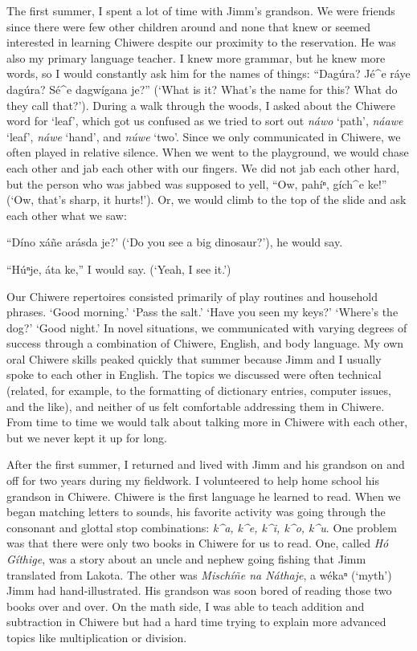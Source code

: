 \documentclass[output=paper]{LSP/langsci}
\begin{document}
The first summer, I spent a lot of time with Jimm's grandson. We were friends since there were few other children around and none that knew or seemed interested in learning Chiwere despite our proximity to the reservation. He was also my primary language teacher. I knew more grammar, but he knew more words, so I would constantly ask him for the names of things: ``Dagúra? Jé\^{ }e ráye dagúra? Sé\^{ }e dagwígana je?'' (`What is it? What's the name for this? What do they call that?'). During a walk through the woods, I asked about the Chiwere word for `leaf', which got us confused as we tried to sort out \emph{náwo} `path', \emph{náawe} `leaf', \emph{náwe} `hand', and \emph{núwe} `two'. Since we only communicated in Chiwere, we often played in relative silence. When we went to the playground, we would chase each other and jab each other with our fingers. We did not jab each other hard, but the person who was jabbed was supposed to yell, ``Ow, pahíⁿ, gích\^{ }e ke!'' (`Ow, that's sharp, it hurts!'). Or, we would climb to the top of the slide and ask each other what we saw:

	``Díno xáñe arásda je?' (`Do you see a big dinosaur?'), he would say.
	
	``Húⁿje, áta ke,'' I would say. (`Yeah, I see it.')

Our Chiwere repertoires consisted primarily of play routines and household phrases. `Good morning.' `Pass the salt.' `Have you seen my keys?' `Where's the dog?' `Good night.' In novel situations, we communicated with varying degrees of success through a combination of Chiwere, English, and body language. My own oral Chiwere skills peaked quickly that summer because Jimm and I usually spoke to each other in English. The topics we discussed were often technical (related, for example, to the formatting of dictionary entries, computer issues, and the like), and neither of us felt comfortable addressing them in Chiwere. From time to time we would talk about talking more in Chiwere with each other, but we never kept it up for long.

After the first summer, I returned and lived with Jimm and his grandson on and off for two years during my fieldwork. I volunteered to help home school his grandson in Chiwere. Chiwere is the first language he learned to read. When we began matching letters to sounds, his favorite activity was going through the consonant and glottal stop combinations: \emph{k\^{ }a, k\^{ }e, k\^{ }i, k\^{ }o, k\^{ }u}. One problem was that there were only two books in Chiwere for us to read. One, called \emph{Hó Gíthige}, was a story about an uncle and nephew going fishing that Jimm translated from Lakota. The other was \emph{Mischíñe na Náthaje}, a wékaⁿ (`myth') Jimm had hand-illustrated. His grandson was soon bored of reading those two books over and over. On the math side, I was able to teach addition and subtraction in Chiwere but had a hard time trying to explain more advanced topics like multiplication or division.
\end{document}
